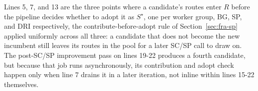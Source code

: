 Lines 5, 7, and 13 are the three points where a candidate's routes enter $R$ before the pipeline decides whether to adopt it as $S^\star$, one per worker group, BG, SP, and DRI respectively, the contribute-before-adopt rule of Section~\ref{sec:fra-sp} applied uniformly across all three: a candidate that does not become the new incumbent still leaves its routes in the pool for a later SC/SP call to draw on. The post-SC/SP improvement pass on lines 19-22 produces a fourth candidate, but because that job runs asynchronously, its contribution and adopt check happen only when line 7 drains it in a later iteration, not inline within lines 15-22 themselves.